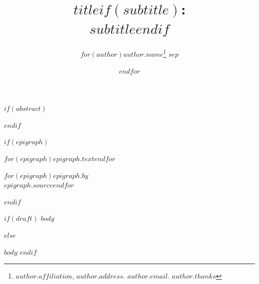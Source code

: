 \documentclass[12pt,letterpaper,twoside]{article}
\title{\Large\textbf{{$title$}$if(subtitle)$:\\ $subtitle$}$endif$}
\author{$for(author)$\normalsize{$author.name$}\thanks{$author.affiliation$, $author.address$. $author.email$. $author.thanks$} $sep$ \and $endfor$}
\date{}
\begin{document}

\maketitle

$if(abstract)$
\begin{abstract}
\footnotesize
{}
\end{abstract}
$endif$

$if(epigraph)$
\epigraph{{$for(epigraph)$\itshape{$epigraph.text$}$endfor$}}%
{$for(epigraph)${$epigraph.by$}\\ {$epigraph.source$}$endfor$}
$endif$

$if(draft)$
\doublespacing
$body$

$else$
\singlespacing

$body$
$endif$
\end{document}
